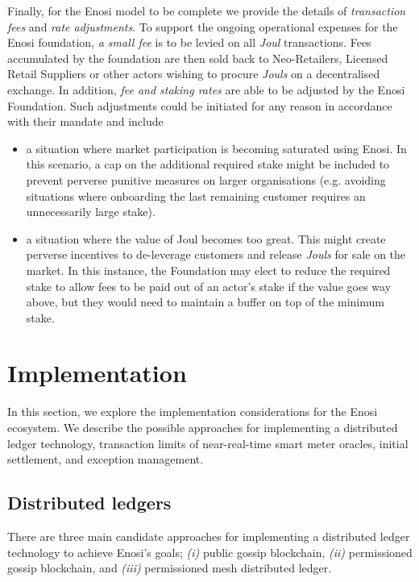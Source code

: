 \documentclass[a4paper,12pt,reqno]{amsart}
\theoremstyle{definition}
\begin{document}
Finally, for the Enosi model to be complete we provide the details of \textit{transaction fees} and \textit{rate adjustments}. 
To support the ongoing operational expenses for the Enosi foundation, \textit{a small fee} is to be levied on all \textit{Joul} transactions. Fees accumulated by the foundation are then sold back to Neo-Retailers, Licensed Retail Suppliers or other actors wishing to procure \textit{Jouls} on a decentralised exchange. In addition, \textit{fee and staking rates} are able to be adjusted by the Enosi Foundation. Such adjustments could be initiated for any reason in accordance with their mandate and include
\begin{itemize}
\item{a situation where market participation is becoming saturated using Enosi. In this scenario, a cap on the additional required stake might be included to prevent perverse punitive measures on larger organisations (e.g. avoiding situations where onboarding the last remaining customer requires an unnecessarily large stake).}
\item{a situation where the value of Joul becomes too great. This might create perverse incentives to de-leverage customers and release \textit{Jouls} for sale on the market. In this instance, the Foundation may elect to reduce the required stake to allow fees to be paid out of an actor’s stake if the value goes way above, but they would need to maintain a buffer on top of the minimum stake.}
\end{itemize}


\newpage

\section{Implementation}

In this section, we explore the implementation considerations for the Enosi ecosystem. We describe the possible approaches for implementing a distributed ledger technology, transaction limits of near-real-time smart meter oracles, initial settlement, and exception management.       

\subsection*{Distributed ledgers} There are three main candidate approaches for implementing a distributed ledger technology to achieve Enosi's goals; \textit{(i)} public gossip blockchain, \textit{(ii)} permissioned gossip blockchain, and \textit{(iii)} permissioned mesh distributed ledger.
\end{document}
